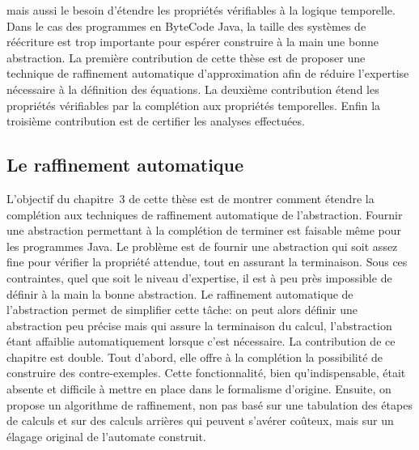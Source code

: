 mais aussi le besoin d'étendre les propriétés vérifiables à la logique temporelle.
Dans le cas des programmes en ByteCode Java, la taille des systèmes de réécriture est trop importante
pour espérer construire à la main une bonne abstraction. La première contribution de cette thèse est de
proposer une technique de raffinement automatique d'approximation
afin de réduire l'expertise nécessaire à la définition des équations.
La deuxième contribution étend les propriétés vérifiables par la complétion aux propriétés temporelles.
Enfin la troisième contribution est de certifier les analyses effectuées.



\bigskip
\subsection*{Le raffinement automatique} 
L'objectif du chapitre~3 de cette thèse est de montrer comment étendre la complétion
aux techniques de raffinement automatique de l'abstraction. Fournir une abstraction permettant à la complétion
de terminer est faisable même pour les programmes Java. Le problème est de fournir une abstraction qui soit assez
fine pour vérifier la propriété attendue, tout en assurant la terminaison. Sous ces contraintes, quel que soit
le niveau d'expertise, il est à peu près impossible de définir à la main la bonne abstraction. Le raffinement automatique
de l'abstraction permet de simplifier cette tâche: on peut alors définir une abstraction peu précise mais qui assure
la terminaison du calcul, l'abstraction étant affaiblie automatiquement lorsque c'est nécessaire.
La contribution de ce chapitre est double. Tout d'abord, elle offre à la complétion la possibilité de
construire des contre-exemples. Cette fonctionnalité, bien qu'indispensable, était absente et difficile à mettre
en place dans le formalisme d'origine. Ensuite, on propose un algorithme de raffinement, non pas basé 
sur une tabulation des étapes de calculs et sur des calculs arrières qui peuvent s'avérer coûteux, mais sur un élagage 
original de l'automate construit. 

